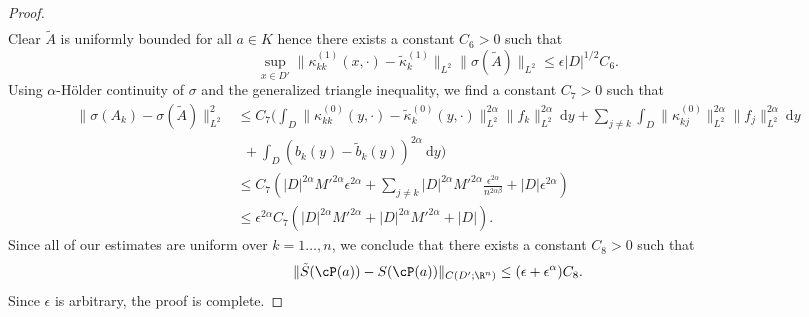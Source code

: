 {\begin{proof}
\begin{align*}
\end{align*}
Clear \(\tilde{A}\) is uniformly bounded for all \(a \in K\) hence there exists a constant \(C_6 > 0\) such that
\[\sup_{x \in D'} \|\kappa_{kk}^{(1)}(x,\cdot) - \tilde{\kappa}_k^{(1)} \|_{L^2} \|\sigma(\tilde{A})\|_{L^2} \leq \epsilon |D|^{1/2} C_6.\]
Using \(\alpha\)-H{\"o}lder continuity of \(\sigma\) and the generalized triangle inequality, we find a constant \(C_7 > 0\) such that
\begin{align*}
    \|\sigma(A_k) - \sigma(\tilde{A})\|_{L^2}^2 &\leq C_7 \bigg ( \int_D \|\kappa^{(0)}_{kk}(y,\cdot) - \tilde{\kappa}^{(0)}_k(y,\cdot)\|_{L^2}^{2\alpha} \|f_k\|_{L^2}^{2\alpha} \: \text{d}y + \sum_{j \neq k} \int_D \|\kappa^{(0)}_{kj}\|_{L^2}^{2\alpha} \|f_j\|_{L^2}^{2\alpha} \: \text{d}y \\
    &\:\:+ \int_D (b_k(y) - \tilde{b}_k(y))^{2\alpha} \: \text{d}y \bigg ) \\
    &\leq C_7 \left ( |D|^{2\alpha} M'^{2\alpha} \epsilon^{2\alpha} + \sum_{j \neq k} |D|^{2\alpha} M'^{2\alpha} \frac{\epsilon^{2\alpha}}{n^{2 \alpha \beta}} + |D| \epsilon^{2\alpha} \right ) \\
    &\leq \epsilon^{2\alpha} C_7 \left ( |D|^{2\alpha} M'^{2\alpha} +  |D|^{2\alpha} M'^{2\alpha} + |D| \right ).
\end{align*}
Since all of our estimates are uniform over \(k = 1\dots,n\), we conclude that there exists a constant \(C_8 > 0\) such that
\[\|\tilde{S}(\cP(a)) - S(\cP(a))\|_{C(D';\R^n)} \leq (\epsilon + \epsilon^\alpha)C_8.\]
Since \(\epsilon\) is arbitrary, the proof is complete. 
\end{proof}
}
\fi
